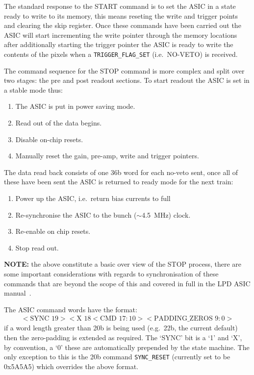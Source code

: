 The standard response to the START command is to set the ASIC in a state ready to write to its memory, this means reseting the write and trigger points and clearing the skip register. Once these commands have been carried out the ASIC will start incrementing the write pointer through the memory locations after additionally starting the trigger pointer the ASIC is ready to write the contents of the pixels when a \texttt{TRIGGER\_FLAG\_SET} (i.e.\ NO-VETO) is received. 

The command sequence for the STOP command is more complex and split over two stages: the pre and post readout sections. To start readout the ASIC is set in a stable mode thus:
\begin{enumerate}
  \item The ASIC is put in power saving mode.
  \item Read out of the data begins.
  \item Disable on-chip resets.
  \item Manually reset the gain, pre-amp, write and trigger pointers.
\end{enumerate}
The data read back consists of one 36b word for each no-veto sent, once all of these have been sent the ASIC is returned to ready mode for the next train:
\begin{enumerate}
  \item Power up the ASIC, i.e.\ return bias currents to full
  \item Re-synchronise the ASIC to the bunch (\( \sim \)4.5~MHz) clock.
  \item Re-enable on chip resets.
  \item Stop read out.
\end{enumerate}
\textbf{NOTE:} the above constitute a basic over view of the STOP process, there are some important considerations with regards to synchronisation of these commands that are beyond the scope of this and covered in full in the LPD ASIC manual~\cite{LPD manual again}.

The ASIC command words have the format:
\begin{align}\label{fmt:asic_format}
  <\text{SYNC }19><\text{X }18<\text{CMD } 17:10><\text{PADDING\_ZEROS } 9:0>
\end{align}
if a word length greater than 20b is being used (e.g.\ 22b, the current default) then the zero-padding is extended as required. The `SYNC' bit is a `1' and `X', by convention, a `0' these are automatically prepended by the state machine. The only exception to this is the 20b command \texttt{SYNC\_RESET} (currently set to be 0x5A5A5) which overrides the above format.


